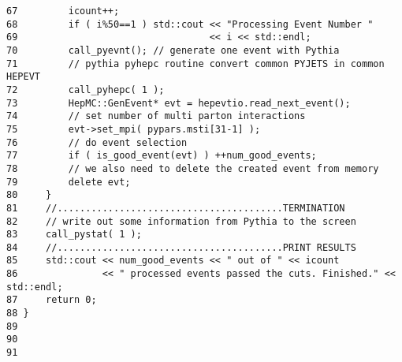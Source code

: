 \begin{DocInclude}
\begin{verbatim}
67         icount++;
68         if ( i%50==1 ) std::cout << "Processing Event Number " 
69                                  << i << std::endl;
70         call_pyevnt(); // generate one event with Pythia
71         // pythia pyhepc routine convert common PYJETS in common HEPEVT
72         call_pyhepc( 1 );
73         HepMC::GenEvent* evt = hepevtio.read_next_event();
74         // set number of multi parton interactions
75         evt->set_mpi( pypars.msti[31-1] );
76         // do event selection
77         if ( is_good_event(evt) ) ++num_good_events;
78         // we also need to delete the created event from memory
79         delete evt;
80     }
81     //........................................TERMINATION
82     // write out some information from Pythia to the screen
83     call_pystat( 1 );    
84     //........................................PRINT RESULTS
85     std::cout << num_good_events << " out of " << icount 
86               << " processed events passed the cuts. Finished." << std::endl;
87     return 0;
88 }
89 
90 
91  
\end{verbatim}
\end{DocInclude}
 